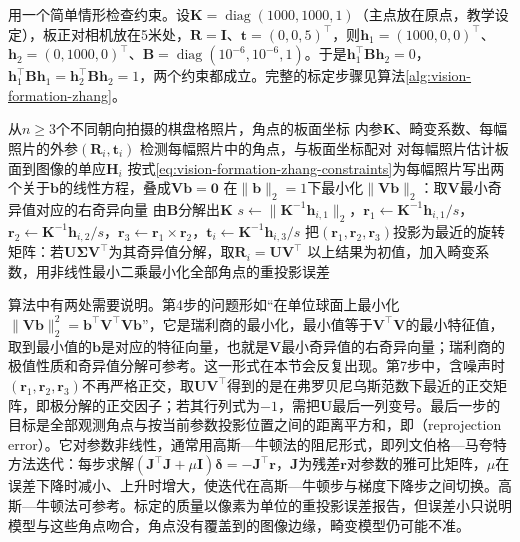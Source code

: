 用一个简单情形检查约束。设$\bm K=\operatorname{diag}(1000,1000,1)$（主点放在原点，教学设定），板正对相机放在5米处，$\bm R=\bm I$、$\bm t=(0,0,5)^\top$，则$\bm h_1=(1000,0,0)^\top$、$\bm h_2=(0,1000,0)^\top$、$\bm B=\operatorname{diag}(10^{-6},10^{-6},1)$。于是$\bm h_1^\top\bm B\bm h_2=0$，$\bm h_1^\top\bm B\bm h_1=\bm h_2^\top\bm B\bm h_2=1$，两个约束都成立。完整的标定步骤见算法\ref{alg:vision-formation-zhang}。

\begin{algorithm}[平面棋盘格相机标定]
  \label{alg:vision-formation-zhang}
  \begin{algorithmic}[1]
    \Require 从$n\ge3$个不同朝向拍摄的棋盘格照片，角点的板面坐标
    \Ensure 内参$\bm K$、畸变系数、每幅照片的外参$(\bm R_i,\bm t_i)$
    \State 检测每幅照片中的角点，与板面坐标配对
    \State 对每幅照片估计板面到图像的单应$\bm H_i$
    \State 按式\eqref{eq:vision-formation-zhang-constraints}为每幅照片写出两个关于$\bm b$的线性方程，叠成$\bm V\bm b=\bm0$
    \State 在$\lVert\bm b\rVert_2=1$下最小化$\lVert\bm V\bm b\rVert_2$：取$\bm V$最小奇异值对应的右奇异向量
    \State 由$\bm B$分解出$\bm K$
      \State $s\gets\lVert\bm K^{-1}\bm h_{i,1}\rVert_2$，$\bm r_1\gets\bm K^{-1}\bm h_{i,1}/s$，$\bm r_2\gets\bm K^{-1}\bm h_{i,2}/s$，$\bm r_3\gets\bm r_1\times\bm r_2$，$\bm t_i\gets\bm K^{-1}\bm h_{i,3}/s$
      \State 把$(\bm r_1,\bm r_2,\bm r_3)$投影为最近的旋转矩阵：若$\bm U\bm\Sigma\bm V^\top$为其奇异值分解，取$\bm R_i=\bm U\bm V^\top$
    \EndFor
    \State 以上结果为初值，加入畸变系数，用非线性最小二乘最小化全部角点的重投影误差
  \end{algorithmic}
\end{algorithm}

算法中有两处需要说明。第4步的问题形如“在单位球面上最小化$\lVert\bm V\bm b\rVert_2^2=\bm b^\top\bm V^\top\bm V\bm b$”，它是瑞利商的最小化，最小值等于$\bm V^\top\bm V$的最小特征值，取到最小值的$\bm b$是对应的特征向量，也就是$\bm V$最小奇异值的右奇异向量；瑞利商的极值性质和奇异值分解可参考。这一形式在本节会反复出现。第7步中，含噪声时$(\bm r_1,\bm r_2,\bm r_3)$不再严格正交，取$\bm U\bm V^\top$得到的是在弗罗贝尼乌斯范数下最近的正交矩阵，即极分解的正交因子；若其行列式为$-1$，需把$\bm U$最后一列变号。最后一步的目标是全部观测角点与按当前参数投影位置之间的距离平方和，即（reprojection error）。它对参数非线性，通常用高斯—牛顿法的阻尼形式，即列文伯格—马夸特方法迭代：每步求解$(\bm J^\top\bm J+\mu\bm I)\bm\delta=-\bm J^\top\bm r$，$\bm J$为残差$\bm r$对参数的雅可比矩阵，$\mu$在误差下降时减小、上升时增大，使迭代在高斯—牛顿步与梯度下降步之间切换。高斯—牛顿法可参考。标定的质量以像素为单位的重投影误差报告，但误差小只说明模型与这些角点吻合，角点没有覆盖到的图像边缘，畸变模型仍可能不准。

